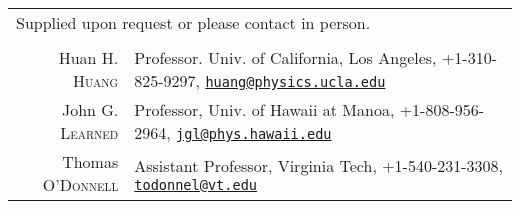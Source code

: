 \documentclass[a4paper,10pt]{article} %
\begin{document}
\begin{tabular}{rp{12cm}}
\multicolumn{2}{l}{\footnotesize{Supplied upon request or please contact in
	person.}}\\
\multicolumn{2}{c}{}\\
Huan H. \textsc{Huang} & Professor. Univ. of California, Los Angeles, +1-310-825-9297,
\href{mailto:huang@physics.ucla.edu}{\nolinkurl{huang@physics.ucla.edu}}\\
John G. \textsc{Learned} & Professor, Univ. of Hawaii at Manoa, +1-808-956-2964,
\href{mailto:jgl@phys.hawaii.edu}{\nolinkurl{jgl@phys.hawaii.edu}}\\
Thomas \textsc{O'Donnell} & Assistant Professor, Virginia Tech, +1-540-231-3308,
\href{mailto:tdonnell@vt.edu}{\nolinkurl{todonnel@vt.edu}}\\

%
%

\end{tabular}

\end{document}
